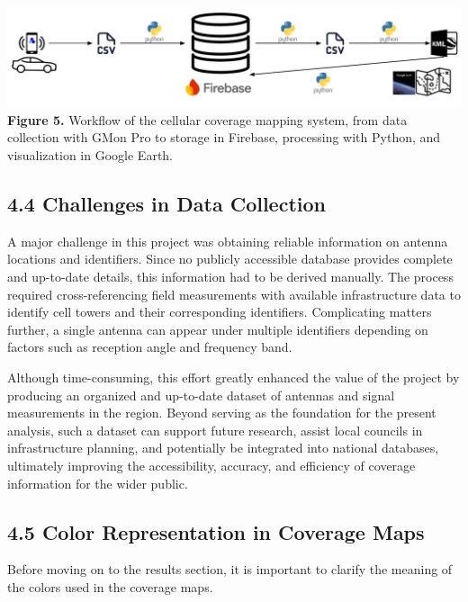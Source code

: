 \documentclass[11pt]{article}
\begin{document}
\includegraphics[width=1.0\textwidth]{figures/media/image3.png}\\
\textbf{Figure 5.} Workflow of the cellular coverage mapping system,
from data collection with GMon Pro to storage in Firebase, processing
with Python, and visualization in Google Earth.

\hypertarget{challenges-in-data-collection}{%
\subsection{4.4 Challenges in Data
Collection}\label{challenges-in-data-collection}}

A major challenge in this project was obtaining reliable information on
antenna locations and identifiers. Since no publicly accessible database
provides complete and up-to-date details, this information had to be
derived manually. The process required cross-referencing field
measurements with available infrastructure data to identify cell towers
and their corresponding identifiers. Complicating matters further, a
single antenna can appear under multiple identifiers depending on
factors such as reception angle and frequency band.

Although time-consuming, this effort greatly enhanced the value of the
project by producing an organized and up-to-date dataset of antennas and
signal measurements in the region. Beyond serving as the foundation for
the present analysis, such a dataset can support future research, assist
local councils in infrastructure planning, and potentially be integrated
into national databases, ultimately improving the accessibility,
accuracy, and efficiency of coverage information for the wider public.

\hypertarget{color-representation-in-coverage-maps}{%
\subsection{4.5 Color Representation in Coverage Maps}\label{color-representation-in-coverage-maps}}

Before moving on to the results section, it is important to clarify the meaning of the colors used in the coverage maps.
\end{document}
